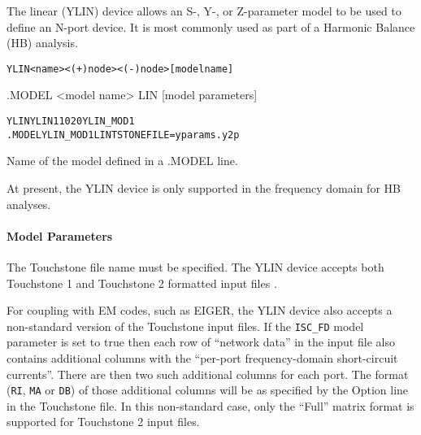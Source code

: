 

The linear (YLIN) device allows an S-, Y-, or Z-parameter model to
be used to define an N-port device.  It is most commonly used
as part of a Harmonic Balance (HB) analysis.

\begin{Device}\label{YLIN_DEVICE}

\device
\begin{alltt}
YLIN <name>  <(+) node> <(-) node> [model name]
\end{alltt}

\model
.MODEL <model name> LIN [model parameters]

\examples
\begin{alltt}
YLIN YLIN1 1 0 2 0 YLIN_MOD1
.MODEL YLIN_MOD1 LIN TSTONEFILE=yparams.y2p
\end{alltt}

\parameters
\begin{Parameters}

  Name of the model defined in a .MODEL line.

\end{Parameters}

\comments
At present, the YLIN device is only supported in the frequency domain for HB analyses.

\end{Device}


\paragraph{Model Parameters}


The Touchstone file name must be specified.  The YLIN device accepts both
Touchstone 1 and Touchstone 2 formatted input files \cite{touchstone2_std_2009}.

For coupling with EM codes, such as EIGER, the YLIN device also accepts
a non-standard version of the Touchstone input files.  If the \texttt{ISC\_FD}
model parameter is set to true then each row of ``network data'' in the input
file also contains additional columns with the ``per-port frequency-domain
short-circuit currents''.   There are then two such additional columns for each
port.  The format (\texttt{RI}, \texttt{MA} or \texttt{DB}) of those additional
columns will be as specified by the Option line in the Touchstone file.  In this
non-standard case, only the ``Full'' matrix format is supported for
Touchstone 2 input files.




